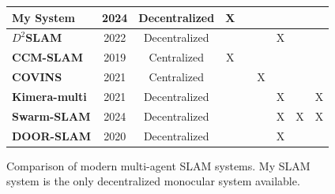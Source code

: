 \begin{figure}[h]
{\begin{tabular}{ |l|c|c|c|c|c|c|c|c| }
            \hline
            \textbf{My System}                                    & 2024                           & Decentralized          & X                                   &                                  &                        &                        &                        &                        \\
            \hline
            \textbf{$D^2$SLAM\autocite{xu2022d}}                  & 2022                           & Decentralized          &                                     &                                  &                        & X                      &                        &                        \\
            \hline
            \textbf{CCM-SLAM\autocite{schmuck2019ccm}}            & 2019                           & Centralized            & X                                   &                                  &                        &                        &                        &                        \\
            \hline
            \textbf{COVINS\autocite{schmuck2021covins}}           & 2021                           & Centralized            &                                     &                                  & X                      &                        &                        &                        \\
            \hline
            \textbf{Kimera-multi\autocite{tian22tro_kimeramulti}} & 2021                           & Decentralized          &                                     &                                  &                        & X                      &                        & X                      \\
            \hline
            \textbf{Swarm-SLAM\autocite{lajoieSwarmSLAM}}         & 2024                           & Decentralized          &                                     &                                  &                        & X                      & X                      & X                      \\
            \hline
            \textbf{DOOR-SLAM\autocite{Lajoie2020DOORSLAM}}       & 2020                           & Decentralized          &                                     &                                  &                        & X                      &                        &                        \\
            \hline
        \end{tabular}
    }

    \caption{Comparison of modern multi-agent SLAM systems. My SLAM system is the only decentralized monocular system available.}
    \label{fig:related-work-sensor-configurations}
\end{figure}

